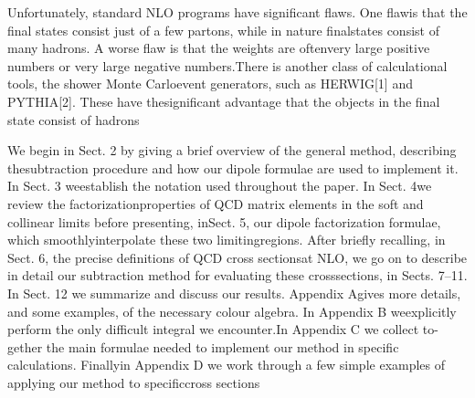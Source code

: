 Unfortunately, standard NLO programs have significant flaws. One flawis that the final states consist just of a few partons, while in nature finalstates consist of many hadrons. A worse flaw is that the weights are oftenvery large positive numbers or very large negative numbers.There is another class of calculational tools, the shower Monte Carloevent generators, such as HERWIG[1] and PYTHIA[2]. These have thesignificant advantage that the objects in the final state consist of hadrons


We begin in Sect. 2 by giving a brief overview of the general method, describing thesubtraction procedure and how our dipole formulae are used to implement it. In Sect. 3 weestablish the notation used throughout the paper. In Sect. 4we review the factorizationproperties of QCD matrix elements in the soft and collinear limits before presenting, inSect. 5, our dipole factorization formulae, which smoothlyinterpolate these two limitingregions. After briefly recalling, in Sect. 6, the precise definitions of QCD cross sectionsat NLO, we go on to describe in detail our subtraction method for evaluating these crosssections, in Sects. 7–11. In Sect. 12 we summarize and discuss our results. Appendix Agives more details, and some examples, of the necessary colour algebra. In Appendix B weexplicitly perform the only difficult integral we encounter.In Appendix C we collect to-gether the main formulae needed to implement our method in specific calculations. Finallyin Appendix D we work through a few simple examples of applying our method to specificcross sections